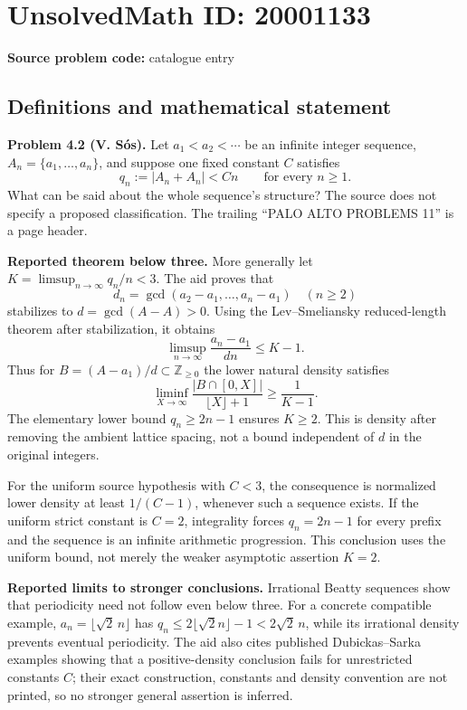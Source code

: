 \documentclass[11pt]{article}
\newcommand{\Z}{\mathbb{Z}}
\begin{document}
\section*{UnsolvedMath ID: 20001133}
\textbf{Source problem code:} catalogue entry
\subsection{Definitions and mathematical statement}
\textbf{Problem 4.2 (V. S\'os).} Let $a_1<a_2<\cdots$ be an infinite integer sequence, $A_n=\{a_1,\ldots,a_n\}$, and suppose one fixed constant $C$ satisfies
\[
 q_n:=|A_n+A_n|<Cn\qquad\text{for every }n\geq1.
\]
What can be said about the whole sequence's structure? The source does not specify a proposed classification. The trailing ``PALO ALTO PROBLEMS 11'' is a page header.

\textbf{Reported theorem below three.} More generally let $K=\limsup_{n\to\infty}q_n/n<3$. The aid proves that
\[
 d_n=\gcd(a_2-a_1,\ldots,a_n-a_1)\quad(n\geq2)
\]
stabilizes to $d=\gcd(A-A)>0$. Using the Lev--Smeliansky reduced-length theorem after stabilization, it obtains
\[
 \limsup_{n\to\infty}\frac{a_n-a_1}{dn}\leq K-1.
\]
Thus for $B=(A-a_1)/d\subset\Z_{\geq0}$ the lower natural density satisfies
\[
 \liminf_{X\to\infty}\frac{|B\cap[0,X]|}{\lfloor X\rfloor+1}\geq\frac1{K-1}.
\]
The elementary lower bound $q_n\geq2n-1$ ensures $K\geq2$. This is density after removing the ambient lattice spacing, not a bound independent of $d$ in the original integers.

For the uniform source hypothesis with $C<3$, the consequence is normalized lower density at least $1/(C-1)$, whenever such a sequence exists. If the uniform strict constant is $C=2$, integrality forces $q_n=2n-1$ for every prefix and the sequence is an infinite arithmetic progression. This conclusion uses the uniform bound, not merely the weaker asymptotic assertion $K=2$.

\textbf{Reported limits to stronger conclusions.} Irrational Beatty sequences show that periodicity need not follow even below three. For a concrete compatible example, $a_n=\lfloor\sqrt2\,n\rfloor$ has $q_n\leq2\lfloor\sqrt2 n\rfloor-1<2\sqrt2\,n$, while its irrational density prevents eventual periodicity. The aid also cites published Dubickas--Sarka examples showing that a positive-density conclusion fails for unrestricted constants $C$; their exact construction, constants and density convention are not printed, so no stronger general assertion is inferred.
\end{document}
